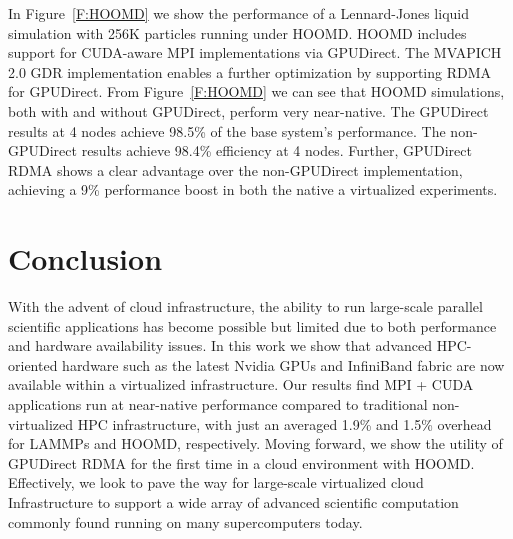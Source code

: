 \documentclass[times,10pt,twocolumn,conference]{IEEEtran}
\begin{document}
In Figure~\ref{F:HOOMD} we show the performance of a Lennard-Jones liquid
simulation with 256K particles running under HOOMD.  HOOMD includes support for
CUDA-aware MPI implementations via GPUDirect.  The MVAPICH 2.0 GDR
implementation enables a further optimization by supporting RDMA for GPUDirect.
From Figure~\ref{F:HOOMD} we can see that HOOMD simulations, both with and
without GPUDirect, perform very near-native.  The GPUDirect results at 4 nodes
achieve 98.5\% of the base system's performance.  The non-GPUDirect results
achieve 98.4\% efficiency at 4 nodes.  Further, GPUDirect RDMA shows a clear advantage over the non-GPUDirect
implementation, achieving a 9\% performance boost in both the native a
virtualized experiments.



\section{Conclusion}

With the advent of cloud infrastructure, the ability to run large-scale parallel scientific applications has become possible but limited due to both performance and hardware availability issues. In this work we show that advanced HPC-oriented hardware such as the latest Nvidia GPUs and InfiniBand fabric are now available within a virtualized infrastructure. Our results find MPI + CUDA applications run at near-native performance compared to traditional non-virtualized HPC infrastructure, with just an averaged 1.9\% and 1.5\% overhead for LAMMPs and HOOMD, respectively. Moving forward, we show the utility of GPUDirect RDMA for the first time in a cloud environment with HOOMD.  Effectively, we look to pave the way for large-scale virtualized cloud Infrastructure to support a wide array of advanced scientific computation commonly found running on many supercomputers today.  %










\end{document}
